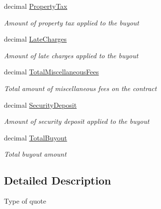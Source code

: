 \begin{DoxyCompactItemize}
decimal \mbox{\hyperlink{class_g_f_s_c_1_1_services_1_1_end_of_term_1_1_quote_info_a2542108f3e6aa327053bab4ca880da67}{Property\+Tax}}
\begin{DoxyCompactList}\small\item\em Amount of property tax applied to the buyout \end{DoxyCompactList}\item 
decimal \mbox{\hyperlink{class_g_f_s_c_1_1_services_1_1_end_of_term_1_1_quote_info_afa39c042aca441b6dba5c3aeb8d21a99}{Late\+Charges}}
\begin{DoxyCompactList}\small\item\em Amount of late charges applied to the buyout \end{DoxyCompactList}\item 
decimal \mbox{\hyperlink{class_g_f_s_c_1_1_services_1_1_end_of_term_1_1_quote_info_a4fff975c5f351e24278284de0b36569c}{Total\+Miscellaneous\+Fees}}
\begin{DoxyCompactList}\small\item\em Total amount of miscellaneous fees on the contract \end{DoxyCompactList}\item 
decimal \mbox{\hyperlink{class_g_f_s_c_1_1_services_1_1_end_of_term_1_1_quote_info_a4007a4ac9e2e493f5d5309f0f070d9cb}{Security\+Deposit}}
\begin{DoxyCompactList}\small\item\em Amount of security deposit applied to the buyout \end{DoxyCompactList}\item 
decimal \mbox{\hyperlink{class_g_f_s_c_1_1_services_1_1_end_of_term_1_1_quote_info_a49593e2310f7aa1d6b3a43a38d1097cd}{Total\+Buyout}}
\begin{DoxyCompactList}\small\item\em Total buyout amount \end{DoxyCompactList}\end{DoxyCompactItemize}


\subsection{Detailed Description}
Type of quote 



